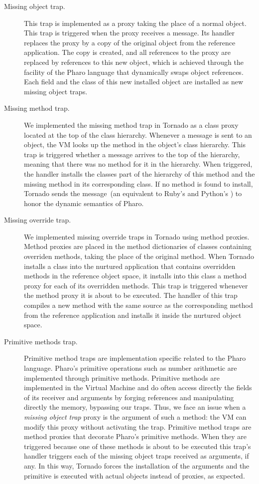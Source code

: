 \begin{description}
\item[Missing object trap.] This trap is implemented as a proxy taking the place of a normal object. This trap is triggered when the proxy receives a message.
Its handler replaces the proxy by a copy of the original object from the reference application.
The copy is created, and all references to the proxy are replaced by references to this new object, which is achieved through the  facility of the Pharo language that dynamically swaps object references.
Each field and the class of this new installed object are installed as new missing object traps.

\item[Missing method trap.]  We implemented the missing method trap in Tornado as a class proxy located at the top of the class hierarchy. Whenever a message is sent to an object, the VM looks up the method in the object's class hierarchy. This trap is triggered whether a message arrives to the top of the hierarchy, meaning that there was no method for it in the hierarchy. When triggered, the handler installs the classes part of the hierarchy of this method and the missing method in its corresponding class. If no method is found to install, Tornado sends the  message~(an equivalent to \eg Ruby's  and Python's ) to honor the dynamic semantics of Pharo.

\item[Missing override trap.] We implemented missing override traps in Tornado using method proxies. Method proxies are placed in the method dictionaries of classes containing overriden methods, taking the place of the original method.  When Tornado installs a class into the nurtured application that contains overridden methods in the reference object space, it installs into this class a method proxy for each of its overridden methods. This trap is triggered whenever the method proxy it is about to be executed. The handler of this trap compiles a new method with the same source as the corresponding method from the reference application and installs it inside the nurtured object space.

\item[Primitive methods trap.] Primitive method traps are implementation specific related to the Pharo language. Pharo's primitive operations such as number arithmetic are implemented through primitive methods. Primitive methods are implemented in the Virtual Machine and do often access directly the fields of its receiver and arguments by forging references and manipulating directly the memory, bypassing our traps. Thus, we face an issue when a \emph{missing object trap} proxy is the argument of such a method: the VM can modify this proxy without activating the trap. Primitive method traps are method proxies that decorate Pharo's primitive methods. When they are triggered because one of these methods is about to be executed this trap's handler triggers each of the missing object traps received as arguments, if any. In this way, Tornado forces the installation of the arguments and the primitive is executed with actual objects instead of proxies, as expected.


\end{description}
